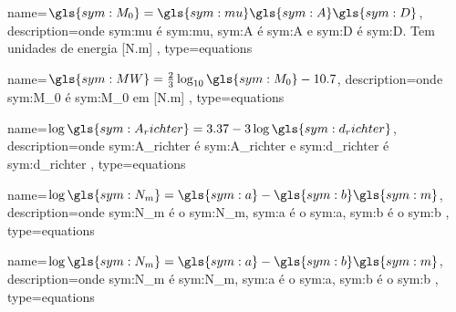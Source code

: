 
{
	name={\ensuremath{\gls{sym:M_0} = \gls{sym:mu}\gls{sym:A}\gls{sym:D}}},
	description={onde \gls{sym:mu} é \glsdesc{sym:mu}, 
				 \gls{sym:A} é \glsdesc{sym:A} e 
				 \gls{sym:D} é \glsdesc{sym:D}. 
				 Tem unidades de energia [N.m]
		 },
	type=equations
}

{
	name={\ensuremath{\gls{sym:MW} = \frac{2}{3} \log_{10}{\gls{sym:M_0}} - 10.7 }},
	description={onde \gls{sym:M_0} é \glsdesc{sym:M_0} em [N.m]
		 },
	type=equations
}

{
	name={\ensuremath{\log{\gls{sym:A_richter}} = 3.37 - 3\log{\gls{sym:d_richter}}}},
	description={onde \gls{sym:A_richter} é \glsdesc{sym:A_richter} e 
					  \gls{sym:d_richter} é \glsdesc{sym:d_richter}
		 },
	type=equations
}

{
	name={\ensuremath{\log{\gls{sym:N_m}} = \gls{sym:a} - \gls{sym:b}\gls{sym:m} }},
	description={onde \gls{sym:N_m} é o \glsdesc{sym:N_m}, 
					  \gls{sym:a} é o \glsdesc{sym:a},
					  \gls{sym:b} é o \glsdesc{sym:b}
    },
	type=equations
}


{
	name={\ensuremath{\log{\gls{sym:N_m}} = \gls{sym:a} - \gls{sym:b}\gls{sym:m} }},
	description={onde \gls{sym:N_m} é \glsdesc{sym:N_m}, 
					  \gls{sym:a} é o \glsdesc{sym:a},
					  \gls{sym:b} é o \glsdesc{sym:b}
    },
	type=equations
}

